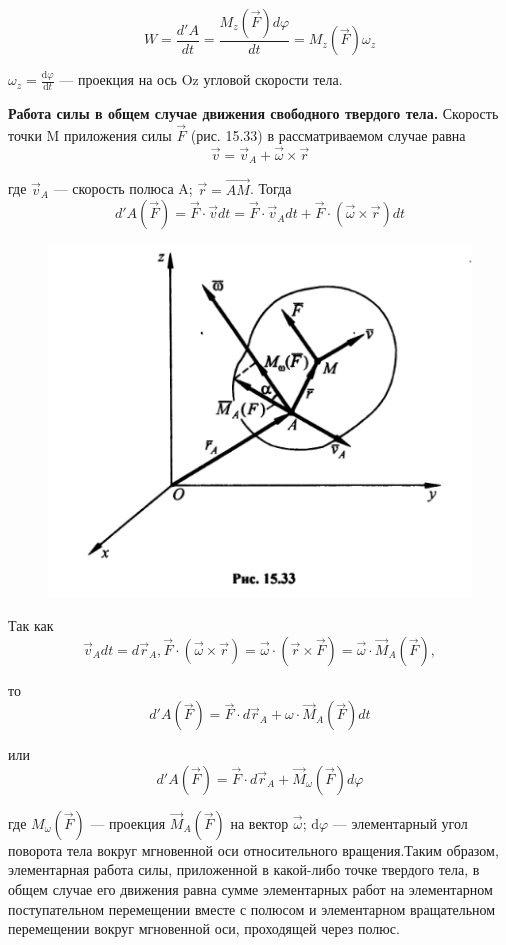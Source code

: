 {\begin{center}
        $$W = \frac{d'A}{dt} = \frac{M_z(\vec F)d\varphi}{dt} = M_z(\vec F)\omega_z$$
    \par $\omega_z = \frac{\mathrm{d}\varphi}{\mathrm{d}t}$  — проекция на ось Oz угловой скорости тела.
    \par \textbf{Работа силы в общем случае движения свободного твердого тела.} Скорость точки M приложения силы $\vec F$  (рис. 15.33) в рассматриваемом случае равна
        $$\vec v = \vec v_A + \vec \omega \times \vec r$$
    \par где  $\vec v_A$ — скорость полюса A;  $\vec r = \vec{AM}$. Тогда
        $$d'A(\vec F) = \vec F \cdot \vec vdt = \vec F \cdot \vec v_Adt + \vec F \cdot (\vec \omega \times \vec r)dt$$
        
    \par \begin{figure}[H]
        \centering\includegraphics[scale=0.5]{img/15.33.jpeg} 
    \end{figure}
        
    \par Так как
        $$\vec v_A dt = d \vec r_A, \vec F \cdot (\vec \omega \times \vec r) = \vec \omega \cdot (\vec r \times \vec F) = \vec \omega \cdot \vec M_A(\vec F), $$
    \par то 
        $$d'A(\vec F) = \vec F \cdot d \vec r_A + \omega \cdot \vec M_A (\vec F) dt$$
    \par или
        $$d'A(\vec F) = \vec F \cdot d \vec r_A + \vec M_\omega (\vec F) d \varphi$$
    \par где $M_{\omega}(\vec F)$ — проекция $\vec M_A(\vec F)$ на вектор  $\vec \omega$; $\mathrm{d}\varphi$  — элементарный угол поворота тела вокруг мгновенной оси относительного вращения.Таким образом, элементарная работа силы, приложенной в какой-либо точке твердого тела, в общем случае его движения равна сумме элементарных работ на элементарном поступательном перемещении вместе с полюсом и элементарном вращательном перемещении вокруг мгновенной оси, проходящей через полюс.
\end{center}
}
